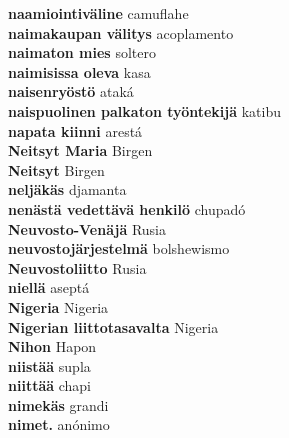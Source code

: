 \textbf{ naamiointiväline  } camuflahe \\
\textbf{ naimakaupan välitys  } acoplamento \\
\textbf{ naimaton mies  } soltero \\
\textbf{ naimisissa oleva  } kasa \\
\textbf{ naisenryöstö  } ataká \\
\textbf{ naispuolinen palkaton työntekijä  } katibu \\
\textbf{ napata kiinni  } arestá \\
\textbf{ Neitsyt Maria  } Birgen \\
\textbf{ Neitsyt  } Birgen \\
\textbf{ neljäkäs  } djamanta \\
\textbf{ nenästä vedettävä henkilö  } chupadó \\
\textbf{ Neuvosto-Venäjä  } Rusia \\
\textbf{ neuvostojärjestelmä  } bolshewismo \\
\textbf{ Neuvostoliitto  } Rusia \\
\textbf{ niellä  } aseptá \\
\textbf{ Nigeria  } Nigeria \\
\textbf{ Nigerian  liittotasavalta  } Nigeria \\
\textbf{ Nihon  } Hapon \\
\textbf{ niistää  } supla \\
\textbf{ niittää  } chapi \\
\textbf{ nimekäs  } grandi \\
\textbf{ nimet.  } anónimo \\
